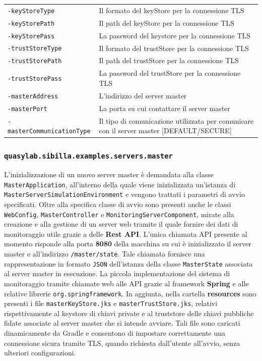 \begin{table}[H]
    \begin{tabularx}{\linewidth}{ l X }
        \texttt{-keyStoreType}   & Il formato del keyStore per la connessione TLS   \\
        \texttt{-keyStorePath}   & Il path del keyStore per la connessione TLS       \\
        \texttt{-keyStorePass}   & La password del keystore per la connessione TLS   \\
        \texttt{-trustStoreType} & Il formato del trustStore per la connessione TLS \\
        \texttt{-trustStorePath} & Il path del trustStore per la connessione TLS     \\
        \texttt{-trustStorePass} & La password del trustStore per la connessione TLS \\
        \texttt{-masterAddress}  & L'indirizzo del server master                     \\
        \texttt{-masterPort}     & La porta su cui contattare il server master       \\
        \texttt{-masterCommunicationType} & Il tipo di comunicazione utilizzata per comunicare con il server master {[}DEFAULT/SECURE{]}
    \end{tabularx}
\end{table}

\subsubsection{\texttt{quasylab.sibilla.examples.servers.master}}

L'inizializzazione di un nuovo server master è demandata alla classe \texttt{MasterApplication}, all'interno della quale viene inizializzata un'istanza di \texttt{MasterServerSimulationEnvironment} e vengono trattati i parametri di avvio specificati.
Oltre alla specifica classe di avvio sono presenti anche le classi \texttt{WebConfig}, \texttt{MasterController} e \texttt{MonitoringServerComponent}, mirate alla creazione e alla gestione di un server web tramite il quale fornire dei dati di monitoraggio utile grazie a delle \textbf{Rest API}. L'unica chiamata API presente al momento risponde alla porta \textbf{8080} della macchina su cui è inizializzato il server master e all'indirizzo \texttt{/master/state}. Tale chiamata fornisce una rappresentazione in formato \texttt{JSON} dell'istanza della classe \texttt{MasterState} associata al server master in esecuzione.
La piccola implementazione del sistema di monitoraggio tramite chiamate web alle API grazie al framework \textbf{Spring} e alle relative librerie \texttt{org.springframework}.
In aggiunta, nella cartella \textbf{resources} sono presenti i file \texttt{masterKeyStore.jks} e \texttt{masterTrustStore.jks}, relativi rispettivamente al keystore di chiavi private e al truststore delle chiavi pubbliche fidate associate al server master che si intende avviare. Tali file sono caricati dinamicamente da Gradle e consentono di impostare correttamente una connessione sicura tramite TLS, quando richiesta dall'utente all'avvio, senza ulteriori configurazioni.

